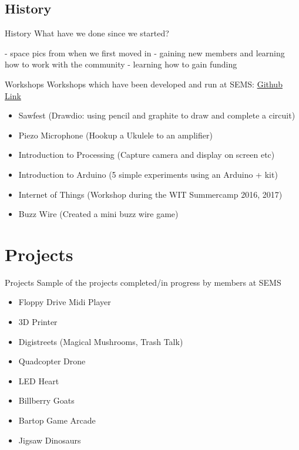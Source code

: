 \documentclass{beamer}
\begin{document}
\subsection{History}
\begin{frame}{History}
What have we done since we started?

- space pics from when we first moved in
- gaining new members and learning how to work with the community
- learning how to gain funding

\end{frame}


\begin{frame}{Workshops}
Workshops which have been developed and run at SEMS: \href{https://github.com/semkr/workshops}{Github Link}
\begin{itemize}
	\item Sawfest (Drawdio: using pencil and graphite to draw and complete a circuit)
	\item Piezo Microphone (Hookup a Ukulele to an amplifier)
	\item Introduction to Processing (Capture camera and display on screen etc)
	\item Introduction to Arduino (5 simple experiments using an Arduino + kit)
	\item Internet of Things (Workshop during the WIT Summercamp 2016, 2017)
	\item Buzz Wire (Created a mini buzz wire game)
\end{itemize}
\end{frame}


\section{Projects}
\begin{frame}{Projects}
Sample of the projects completed/in progress by members at SEMS
\begin{itemize}
	\item Floppy Drive Midi Player
	\item 3D Printer
	\item Digistreets (Magical Mushrooms, Trash Talk)
	\item Quadcopter Drone
	\item LED Heart
	\item Billberry Goats	
	\item Bartop Game Arcade
	\item Jigsaw Dinosaurs
\end{itemize}
\end{frame}
\end{document}

